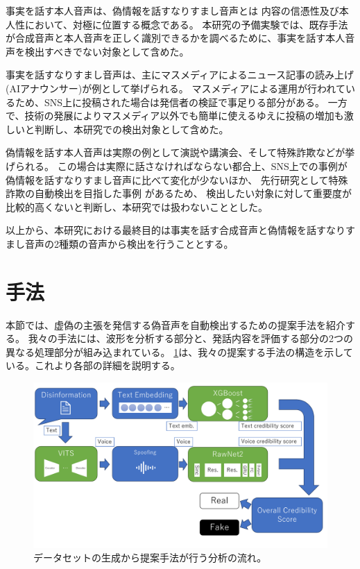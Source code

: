 事実を話す本人音声は、偽情報を話すなりすまし音声とは
内容の信憑性及び本人性において、対極に位置する概念である。
本研究の予備実験では、既存手法が合成音声と本人音声を正しく識別できるかを調べるために、事実を話す本人音声を検出すべきでない対象として含めた。

事実を話すなりすまし音声は、主にマスメディアによるニュース記事の読み上げ(AIアナウンサー)が例として挙げられる\cite{nhk2020,nhkAnnual2020}。
マスメディアによる運用が行われているため、SNS上に投稿された場合は発信者の検証で事足りる部分がある。
一方で、技術の発展によりマスメディア以外でも簡単に使えるゆえに投稿の増加も激しいと判断し、本研究での検出対象として含めた。

偽情報を話す本人音声は実際の例として演説や講演会、そして特殊詐欺などが挙げられる。
この場合は実際に話さなければならない都合上、SNS上での事例が偽情報を話すなりすまし音声に比べて変化が少ないほか、
先行研究として特殊詐欺の自動検出を目指した事例 \cite{近野恵2023}があるため、
検出したい対象に対して重要度が比較的高くないと判断し、本研究では扱わないこととした。

以上から、本研究における最終目的は事実を話す合成音声と偽情報を話すなりすまし音声の2種類の音声から検出を行うこととする。

\section{手法}\label{sec:cnt_mtd}
本節では、虚偽の主張を発信する偽音声を自動検出するための提案手法を紹介する。
我々の手法には、波形を分析する部分と、発話内容を評価する部分の2つの異なる処理部分が組み込まれている。
\cref{fig:structure}は、我々の提案する手法の構造を示している。これより各部の詳細を説明する。

\begin{figure}[p]
    \centering
    \includegraphics[width=\linewidth]{figures/Structure.pdf}
    \caption{データセットの生成から提案手法が行う分析の流れ。}
    \label{fig:structure}
\end{figure}

